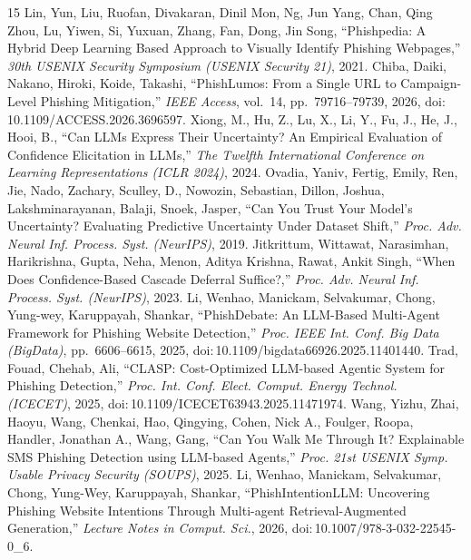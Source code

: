 \begin{thebibliography}{15}
 Lin, Yun, Liu, Ruofan, Divakaran, Dinil Mon, Ng, Jun Yang, Chan, Qing Zhou, Lu, Yiwen, Si, Yuxuan, Zhang, Fan, Dong, Jin Song, ``Phishpedia: A Hybrid Deep Learning Based Approach to Visually Identify Phishing Webpages,'' \emph{30th USENIX Security Symposium (USENIX Security 21)}, 2021.
 Chiba, Daiki, Nakano, Hiroki, Koide, Takashi, ``PhishLumos: From a Single URL to Campaign-Level Phishing Mitigation,'' \emph{IEEE Access}, vol.\ 14, pp.\ 79716--79739, 2026, doi:\,10.1109/ACCESS.2026.3696597.
 Xiong, M., Hu, Z., Lu, X., Li, Y., Fu, J., He, J., Hooi, B., ``Can LLMs Express Their Uncertainty? An Empirical Evaluation of Confidence Elicitation in LLMs,'' \emph{The Twelfth International Conference on Learning Representations (ICLR 2024)}, 2024.
 Ovadia, Yaniv, Fertig, Emily, Ren, Jie, Nado, Zachary, Sculley, D., Nowozin, Sebastian, Dillon, Joshua, Lakshminarayanan, Balaji, Snoek, Jasper, ``Can You Trust Your Model's Uncertainty? Evaluating Predictive Uncertainty Under Dataset Shift,'' \emph{Proc. Adv. Neural Inf. Process. Syst. (NeurIPS)}, 2019.
 Jitkrittum, Wittawat, Narasimhan, Harikrishna, Gupta, Neha, Menon, Aditya Krishna, Rawat, Ankit Singh, ``When Does Confidence-Based Cascade Deferral Suffice?,'' \emph{Proc. Adv. Neural Inf. Process. Syst. (NeurIPS)}, 2023.
 Li, Wenhao, Manickam, Selvakumar, Chong, Yung-wey, Karuppayah, Shankar, ``PhishDebate: An LLM-Based Multi-Agent Framework for Phishing Website Detection,'' \emph{Proc. IEEE Int. Conf. Big Data (BigData)}, pp.\ 6606--6615, 2025, doi:\,10.1109/bigdata66926.2025.11401440.
 Trad, Fouad, Chehab, Ali, ``CLASP: Cost-Optimized LLM-based Agentic System for Phishing Detection,'' \emph{Proc. Int. Conf. Elect. Comput. Energy Technol. (ICECET)}, 2025, doi:\,10.1109/ICECET63943.2025.11471974.
 Wang, Yizhu, Zhai, Haoyu, Wang, Chenkai, Hao, Qingying, Cohen, Nick A., Foulger, Roopa, Handler, Jonathan A., Wang, Gang, ``Can You Walk Me Through It? Explainable SMS Phishing Detection using LLM-based Agents,'' \emph{Proc. 21st USENIX Symp. Usable Privacy Security (SOUPS)}, 2025.
 Li, Wenhao, Manickam, Selvakumar, Chong, Yung-Wey, Karuppayah, Shankar, ``PhishIntentionLLM: Uncovering Phishing Website Intentions Through Multi-agent Retrieval-Augmented Generation,'' \emph{Lecture Notes in Comput. Sci.}, 2026, doi:\,10.1007/978-3-032-22545-0\_6.

\end{thebibliography}
